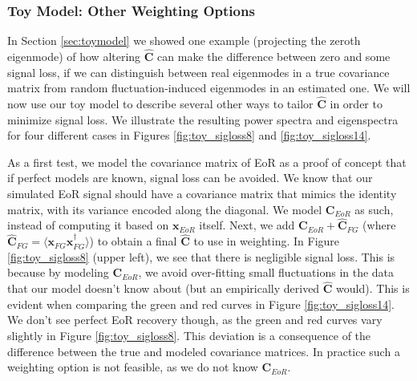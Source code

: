 \documentclass[preprint2,numberedappendix,tighten]{aastex6}  %
\begin{document}
\subsubsection{Toy Model: Other Weighting Options}
\label{sec:otherweight}

In Section \ref{sec:toymodel} we showed one example (projecting the zeroth eigenmode) of how altering $\hat{\textbf{C}}$ can make the difference between zero and some signal loss, if we can distinguish between real eigenmodes in a true covariance matrix from random fluctuation-induced eigenmodes in an estimated one. We will now use our toy model to describe several other ways to tailor $\hat{\textbf{C}}$ in order to minimize signal loss. We illustrate the resulting power spectra and eigenspectra for four different cases in Figures \ref{fig:toy_sigloss8} and \ref{fig:toy_sigloss14}.

As a first test, we model the covariance matrix of EoR as a proof of concept that if perfect models are known, signal loss can be avoided. We know that our simulated EoR signal should have a covariance matrix that mimics the identity matrix, with its variance encoded along the diagonal. We model $\textbf{C}_{EoR}$ as such, instead of computing it based on $\textbf{x}_{EoR}$ itself. Next, we add $\textbf{C}_{EoR} + \hat{\textbf{C}}_{FG}$ (where $\hat{\textbf{C}}_{FG} = \langle\textbf{x}_{FG}\textbf{x}_{FG}^{\dagger}\rangle$) to obtain a final $\hat{\textbf{C}}$ to use in weighting. In Figure \ref{fig:toy_sigloss8} (upper left), we see that there is negligible signal loss. This is because by modeling $\textbf{C}_{EoR}$, we avoid over-fitting small fluctuations in the data that our model doesn't know about (but an empirically derived $\hat{\textbf{C}}$ would). This is evident when comparing the green and red curves in Figure \ref{fig:toy_sigloss14}. We don't see perfect EoR recovery though, as the green and red curves vary slightly in Figure \ref{fig:toy_sigloss8}. This deviation is a consequence of the difference between the true and modeled covariance matrices. In practice such a weighting option is not feasible, as we do not know $\textbf{C}_{EoR}$.
\end{document}
